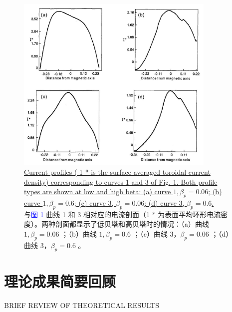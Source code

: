 \documentclass[utf8]{ctexart}
\begin{document}
\begin{sloppypar}
  \begin{figure}[H]
  	\centering
  	\includegraphics[max width=0.85\textwidth,max height=0.35\textheight]{2025_01_10_a0135324997886412d98g-4}
 \caption{\uline{Current profiles ( 1 * is the surface averaged toroidal current density) corresponding to curves 1 and 3 of Fig. 1. Both profile types are shown at low and high beta: (a) curve $1, \beta_{p}=0.06$; (b) curve $1, \beta_{p}=0.6$; (c) curve 3, $\beta_{p}=0.06$; (d) curve 3, $\beta_{p}=0.6$.}\\与\textcolor{blue}{图 1} 曲线 1 和 3 相对应的电流剖面（1 * 为表面平均环形电流密度）。两种剖面都显示了低贝塔和高贝塔时的情况：（a）曲线 $1, \beta_{p}=0.06$ ；（b）曲线 $1, \beta_{p}=0.6$ ；（c）曲线 3，$\beta_{p}=0.06$ ；（d）曲线 3，$\beta_{p}=0.6$ 。}
  	\label{fig2.}
  \end{figure}
  
   
  
 \section{理论成果简要回顾}
 {  \small BRIEF REVIEW OF THEORETICAL RESULTS \par }
 

\end{sloppypar}
\end{document}
